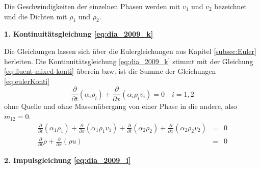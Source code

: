 Die Geschwindigkeiten der einzelnen Phasen werden mit $v_1$ und $v_2$
bezeichnet und die Dichten mit $\rho_1$ und $\rho_2$.

{\bf 1. Kontinuitätsgleichung \ref{eq:dia_2009_k}}


Die Gleichungen lassen sich über die Eulergleichungen aus Kapitel \ref{subsec:Euler}
herleiten.  Die Kontinuitätsgleichung \ref{eq:dia_2009_k} stimmt mit
der Gleichung \ref{eq:fluent-mixed-konti} überein bzw. ist die Summe
der Gleichungen \ref{eq:eulerKonti} 
\[
\frac{\partial}{\partial t} (\alpha_i \rho_i)  + 
\frac{\partial}{\partial x} (\alpha_i\rho_i v_i) = 0 \quad i=1,2
\]
ohne Quelle und ohne Massenübergang von einer Phase in die andere,
also $\dot{m}_{12}=0$.
\begin{eqnarray*}
\frac{\partial}{\partial t} (\alpha_1 \rho_1)  + 
\frac{\partial}{\partial x} (\alpha_1\rho_1 v_1) 
+
\frac{\partial}{\partial t} (\alpha_2 \rho_2) + 
\frac{\partial}{\partial x} (\alpha_2\rho_2 v_2)  &=& 0\\
\frac{\partial}{\partial t} \rho + \frac{\partial}{\partial x} (\rho u) &=& 0
\end{eqnarray*}

{\bf 2. Impulsgleichung \ref{eq:dia_2009_i}}

